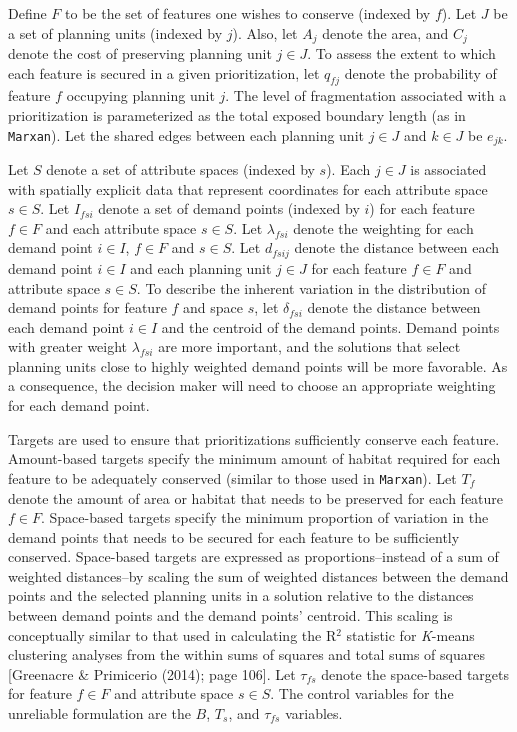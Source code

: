 Define \(F\) to be the set of features one wishes to conserve (indexed
by \(f\)). Let \(J\) be a set of planning units (indexed by \(j\)).
Also, let \(A_j\) denote the area, and \(C_j\) denote the cost of
preserving planning unit \(j \in J\). To assess the extent to which each
feature is secured in a given prioritization, let \(q_{fj}\) denote the
probability of feature \(f\) occupying planning unit \(j\). The level of
fragmentation associated with a prioritization is parameterized as the
total exposed boundary length (as in \texttt{Marxan}). Let the shared
edges between each planning unit \(j \in J\) and \(k \in J\) be
\(e_{jk}\).

Let \(S\) denote a set of attribute spaces (indexed by \(s\)). Each
\(j \in J\) is associated with spatially explicit data that represent
coordinates for each attribute space \(s \in S\). Let \(I_{fsi}\) denote
a set of demand points (indexed by \(i\)) for each feature \(f \in F\)
and each attribute space \(s \in S\). Let \(\lambda_{fsi}\) denote the
weighting for each demand point \(i \in I\), \(f \in F\) and
\(s \in S\). Let \(d_{fsij}\) denote the distance between each demand
point \(i \in I\) and each planning unit \(j \in J\) for each feature
\(f \in F\) and attribute space \(s \in S\). To describe the inherent
variation in the distribution of demand points for feature \(f\) and
space \(s\), let \(\delta_{fsi}\) denote the distance between each
demand point \(i \in I\) and the centroid of the demand points. Demand
points with greater weight \(\lambda_{fsi}\) are more important, and the
solutions that select planning units close to highly weighted demand
points will be more favorable. As a consequence, the decision maker will
need to choose an appropriate weighting for each demand point.

Targets are used to ensure that prioritizations sufficiently conserve
each feature. Amount-based targets specify the minimum amount of habitat
required for each feature to be adequately conserved (similar to those
used in \texttt{Marxan}). Let \(T_f\) denote the amount of area or
habitat that needs to be preserved for each feature \(f \in F\).
Space-based targets specify the minimum proportion of variation in the
demand points that needs to be secured for each feature to be
sufficiently conserved. Space-based targets are expressed as
proportions--instead of a sum of weighted distances--by scaling the sum
of weighted distances between the demand points and the selected
planning units in a solution relative to the distances between demand
points and the demand points' centroid. This scaling is conceptually
similar to that used in calculating the R\(^2\) statistic for
\emph{K}-means clustering analyses from the within sums of squares and
total sums of squares {[}Greenacre \& Primicerio (2014); page 106{]}.
Let \(\tau_{fs}\) denote the space-based targets for feature \(f \in F\)
and attribute space \(s \in S\). The control variables for the
unreliable formulation are the \(B\), \(T_{s}\), and \(\tau_{fs}\)
variables.


